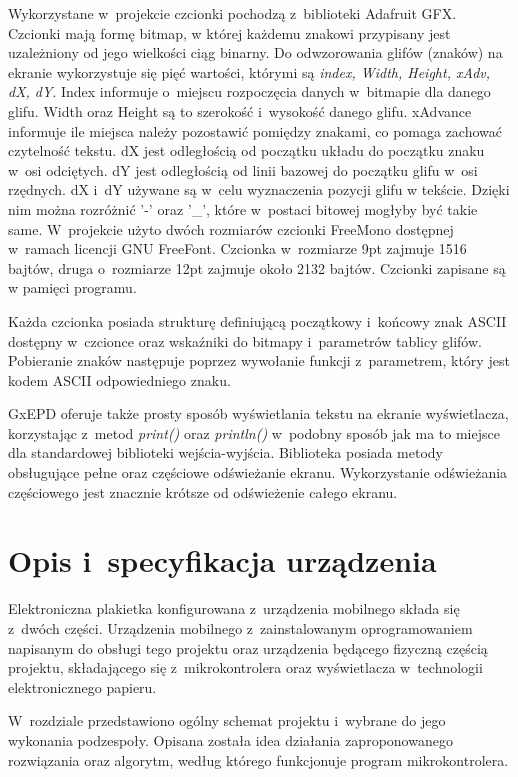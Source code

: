 \documentclass[a4paper,12pt, twoside]{article}
\begin{document}
        Wykorzystane w~projekcie czcionki pochodzą z~biblioteki Adafruit GFX. Czcionki mają formę bitmap, w której każdemu znakowi przypisany jest uzależniony od jego wielkości ciąg binarny. Do odwzorowania glifów (znaków) na ekranie wykorzystuje się pięć wartości, którymi są \textit{index,  Width, Height, xAdv, dX, dY}. Index informuje o~miejscu rozpoczęcia danych w~bitmapie dla danego glifu. Width oraz Height są to szerokość i~wysokość danego glifu. xAdvance informuje ile miejsca należy pozostawić pomiędzy znakami, co pomaga zachować czytelność tekstu. dX jest odległością od początku układu do początku znaku w~osi odciętych. dY jest odległością od linii bazowej do początku glifu w~osi rzędnych. dX i~dY używane są w~celu wyznaczenia pozycji glifu w tekście. Dzięki nim można rozróżnić '-' oraz '\_', które w~postaci bitowej mogłyby być takie same. W~projekcie użyto dwóch rozmiarów czcionki FreeMono dostępnej w~ramach licencji GNU FreeFont. Czcionka w~rozmiarze 9pt zajmuje 1516 bajtów, druga o~rozmiarze 12pt zajmuje około 2132 bajtów. Czcionki zapisane są w pamięci programu.
        
        Każda czcionka posiada strukturę definiującą początkowy i~końcowy znak ASCII dostępny w~czcionce oraz wskaźniki do bitmapy i~parametrów tablicy glifów. Pobieranie znaków następuje poprzez wywołanie funkcji z~parametrem, który jest kodem ASCII odpowiedniego znaku.
        
        GxEPD oferuje także prosty sposób wyświetlania tekstu na ekranie wyświetlacza, korzystając z~metod \textit{print()} oraz \textit{println()} w~podobny sposób jak ma to miejsce dla standardowej biblioteki wejścia-wyjścia. Biblioteka posiada metody obsługujące pełne oraz częściowe odświeżanie ekranu. Wykorzystanie odświeżania częściowego jest znacznie krótsze od odświeżenie całego ekranu.
        
        \newpage
    	\section{Opis i~specyfikacja urządzenia}
    	Elektroniczna plakietka konfigurowana z~urządzenia mobilnego składa się z~dwóch części. Urządzenia mobilnego z~zainstalowanym oprogramowaniem napisanym do obsługi tego projektu oraz urządzenia będącego fizyczną częścią projektu, składającego się z~mikrokontrolera oraz wyświetlacza w~technologii elektronicznego papieru.
    
        W~rozdziale przedstawiono ogólny schemat projektu i~wybrane do jego wykonania podzespoły. Opisana została idea działania zaproponowanego rozwiązania oraz algorytm, według którego funkcjonuje program mikrokontrolera.
        
\end{document}
